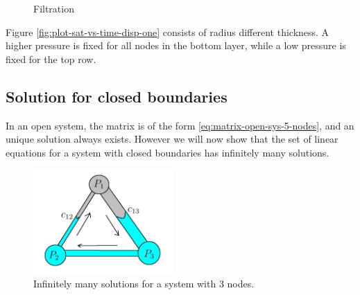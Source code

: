 \documentclass{crm-article}
\begin{document}
			
			\begin{figure}[H]
				\centering
				\caption{Filtration}
			\end{figure}
				
			Figure \ref{fig:plot-sat-vs-time-disp-one} consists of radius different thickness. A higher pressure is fixed for all nodes in the bottom layer, while a low pressure is fixed for the top row.

			
		\subsection{Solution for closed boundaries} \label{sec:closed-boundary-triangle}

			In an open system, the matrix is of the form \ref{eq:matrix-open-sys-5-nodes}, and an unique solution always exists. However we will now show that the set of linear equations for a system with closed boundaries has infinitely many solutions.

			\begin{figure}[H]
				\centering
				\includegraphics[height=4cm]{fig_zero-linearequation}
				\caption{Infinitely many solutions for a system with 3 nodes.}
				\label{fig:zero-la-triangle}
			\end{figure}
			
\end{document}
